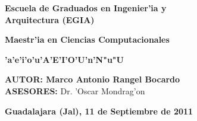 \begin{center}
\Large
\textbf{Escuela de Graduados en Ingenier'ia y\\ Arquitectura (EGIA)}\\
\vspace{20 pt}

\textbf{Maestr'ia en Ciencias Computacionales}\\
\vspace{42 pt}

\Huge
\textbf{'a'e'i'o'u'A'E'I'O'U'n'N"u"U}\\
\vspace{65 pt}

\Large
\begin{flushleft}
\hspace{5pt}\textbf{AUTOR: \hspace{28pt}Marco Antonio Rangel Bocardo}\\
\vspace{5pt}
\hspace{5pt}\textbf{ASESORES:} Dr. 'Oscar Mondrag'on\\
\end{flushleft}

\large
\vspace{20pt}
\textbf{Guadalajara (Jal), 11 de Septiembre de 2011}
\end{center}
\clearpage

\renewcommand{\baselinestretch}{1.5}